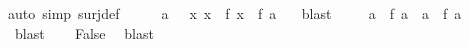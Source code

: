 \begin{isabellebody}
{}auto\ simp{}\ surj{}def{}\isanewline
\ \ \isamarkupfalse%
\ \isamarkupfalse%
\ a\ \ \ {}{}x{}\ x\ {}\ f\ x{}\ {}\ f\ a{}\ \ \isamarkupfalse%
\ blast\isanewline
\ \ \isamarkupfalse%
\ \ {}a\ {}\ f\ a\ {}\ a\ {}\ f\ a{}\ \ \isamarkupfalse%
\ blast\isanewline
\ \ \isamarkupfalse%
\ {}False{}\ \isamarkupfalse%
\ blast\isanewline
{}\isamarkupfalse%
%
\endisatagproof
{\isafoldproof}%
%
\isadelimproof
%
\endisadelimproof
%
\begin{isamarkuptext}%


\end{isamarkuptext}
\end{isabellebody}
